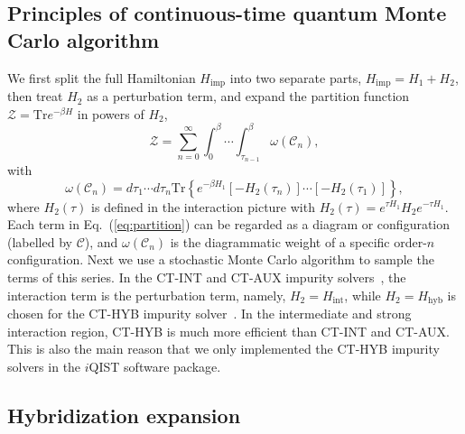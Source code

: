 \subsection{Principles of continuous-time quantum Monte Carlo algorithm}

We first split the full Hamiltonian $H_{\text{imp}}$ into two separate parts, $H_{\text{imp}} = H_1 + H_2$, then treat $H_2$ as a perturbation term, and expand the partition function $\mathcal{Z} = \text{Tr} e^{-\beta H}$ in powers of $H_2$,
\begin{equation}
\label{eq:partition}
\mathcal{Z} = \sum_{n=0}^{\infty} \int_{0}^{\beta} \cdots \int_{\tau_{n-1}}^\beta \omega(\mathcal{C}_n),
\end{equation}
with
\begin{equation}
\label{eq:weight}
\omega(\mathcal{C}_n)=d\tau_1 \cdots d\tau_n \text{Tr}\left\{ e^{-\beta H_1}[-H_2(\tau_n)]\cdots [-H_2(\tau_1)]\right\},
\end{equation}
where $H_2(\tau)$ is defined in the interaction picture with $H_2(\tau) = e^{\tau H_1} H_2 e^{-\tau H_1}$. Each term in Eq.~(\ref{eq:partition}) can be regarded as a diagram or configuration (labelled by $\mathcal{C}$), and $\omega(\mathcal{C}_n)$ is the diagrammatic weight of a specific order-$n$ configuration. Next we use a stochastic Monte Carlo algorithm to sample the terms of this series. In the CT-INT and CT-AUX impurity solvers~\cite{PhysRevB.72.035122,Gull2008}, the interaction term is the perturbation term, namely, $H_2 = H_{\text{int}}$, while $H_2 = H_{\text{hyb}}$ is chosen for the CT-HYB impurity solver~\cite{PhysRevLett.97.076405}. In the intermediate and strong interaction region, CT-HYB is much more efficient than CT-INT and CT-AUX. This is also the main reason that we only implemented the CT-HYB impurity solvers in the $i$QIST software package.

\subsection{Hybridization expansion}

